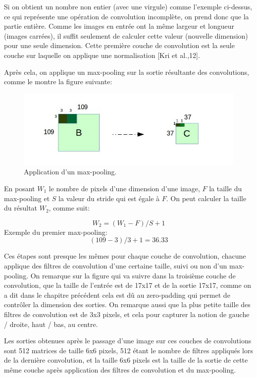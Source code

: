 	Si on obtient un nombre non entier (avec une virgule) comme l'exemple ci-dessus, ce qui représente une opération de convolution incomplète, on prend donc que la partie entière. Comme les images en entrée ont la même largeur et longueur (images carrées), il suffit seulement de calculer cette valeur (nouvelle dimension) pour une seule dimension.
	Cette première couche de convolution est la seule couche sur laquelle on applique une normalisation [Kri et al.,12].
	
	Après cela, on applique un max-pooling sur la sortie résultante des convolutions, comme le montre la figure suivante:

\begin{figure}[H]
	\centering
		\includegraphics[width=7in]{Figures/pool.jpg}
	\caption[An Electron]{Application d'un max-pooling.}
	\label{fig:Electron}
\end{figure}

	En posant $W_{1}$ le nombre de pixels d'une dimension d'une image, $F$ la taille du max-pooling et $S$ la valeur du stride qui est égale à $F$. On peut calculer la taille du résultat $W_{2}$, comme suit:

$$W_{2} = (W_{1} - F )/S + 1$$
Exemple du premier max-pooling: $$(109 - 3)/3 +1 = 36.33$$

	Ces étapes sont presque les mêmes pour chaque couche de convolution, chacune applique des filtres de convolution d'une certaine taille, suivi ou non d'un max-pooling. On remarque sur la figure qui va suivre dans la troisième couche de convolution, que la taille de l'entrée est de 17x17 et de la sortie 17x17, comme on a dit dans le chapitre précédent cela est dû au zero-padding qui permet de contrôler la dimension des sorties. On remarque aussi que la plus petite taille des filtres de convolution est de 3x3 pixels, et cela pour capturer la notion de gauche / droite, haut / bas, au centre.

	Les sorties obtenues après le passage d'une image sur ces couches de convolutions sont 512 matrices de taille 6x6 pixels, 512 étant le nombre de filtres appliqués lors de la dernière convolution, et la taille 6x6 pixels est la taille de la sortie de cette même couche après application des filtres de convolution et du max-pooling.

